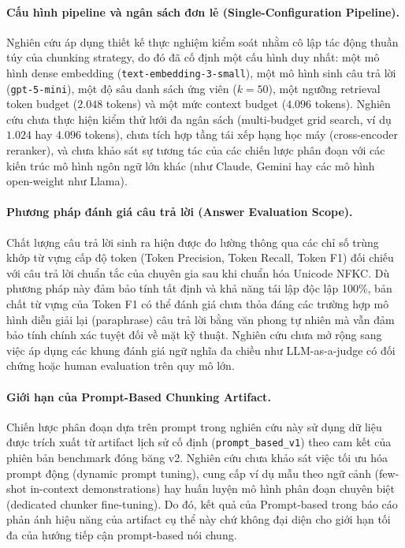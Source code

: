 \paragraph{Cấu hình pipeline và ngân sách đơn lẻ (Single-Configuration Pipeline).}
Nghiên cứu áp dụng thiết kế thực nghiệm kiểm soát nhằm cô lập tác động thuần túy của chunking strategy, do đó đã cố định một cấu hình duy nhất: một mô hình dense embedding (\texttt{text-embedding-3-small}), một mô hình sinh câu trả lời (\texttt{gpt-5-mini}), một độ sâu danh sách ứng viên ($k=50$), một ngưỡng retrieval token budget ($2.048$ tokens) và một mức context budget ($4.096$ tokens). Nghiên cứu chưa thực hiện kiểm thử lưới đa ngân sách (multi-budget grid search, ví dụ $1.024$ hay $4.096$ tokens), chưa tích hợp tầng tái xếp hạng học máy (cross-encoder reranker), và chưa khảo sát sự tương tác của các chiến lược phân đoạn với các kiến trúc mô hình ngôn ngữ lớn khác (như Claude, Gemini hay các mô hình open-weight như Llama).

\paragraph{Phương pháp đánh giá câu trả lời (Answer Evaluation Scope).}
Chất lượng câu trả lời sinh ra hiện được đo lường thông qua các chỉ số trùng khớp từ vựng cấp độ token (Token Precision, Token Recall, Token F1) đối chiếu với câu trả lời chuẩn tắc của chuyên gia sau khi chuẩn hóa Unicode NFKC. Dù phương pháp này đảm bảo tính tất định và khả năng tái lập độc lập 100\%, bản chất từ vựng của Token F1 có thể đánh giá chưa thỏa đáng các trường hợp mô hình diễn giải lại (paraphrase) câu trả lời bằng văn phong tự nhiên mà vẫn đảm bảo tính chính xác tuyệt đối về mặt kỹ thuật. Nghiên cứu chưa mở rộng sang việc áp dụng các khung đánh giá ngữ nghĩa đa chiều như LLM-as-a-judge có đối chứng hoặc human evaluation trên quy mô lớn.

\paragraph{Giới hạn của Prompt-Based Chunking Artifact.}
Chiến lược phân đoạn dựa trên prompt trong nghiên cứu này sử dụng dữ liệu được trích xuất từ artifact lịch sử cố định (\texttt{prompt\_based\_v1}) theo cam kết của phiên bản benchmark đóng băng v2. Nghiên cứu chưa khảo sát việc tối ưu hóa prompt động (dynamic prompt tuning), cung cấp ví dụ mẫu theo ngữ cảnh (few-shot in-context demonstrations) hay huấn luyện mô hình phân đoạn chuyên biệt (dedicated chunker fine-tuning). Do đó, kết quả của Prompt-based trong báo cáo phản ánh hiệu năng của artifact cụ thể này chứ không đại diện cho giới hạn tối đa của hướng tiếp cận prompt-based nói chung.
